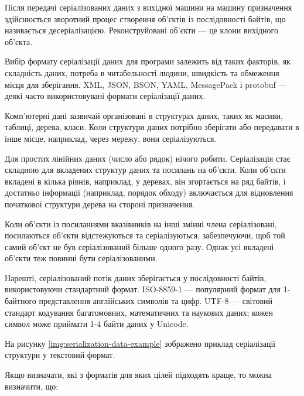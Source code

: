 \documentclass{lib/styles/default-style}
\begin{document}
    Після передачі серіалізованих даних з вихідної машини на машину призначення
    здійснюється зворотний процес створення об'єктів із послідовності байтів, що називається десеріалізацією.
    Реконструйовані об'єкти --- це клони вихідного об'єкта.

    Вибір формату серіалізації даних для програми залежить
    від таких факторів, як складність даних, потреба в читабельності людини, швидкість
    та обмеження місця для зберігання. XML, JSON, BSON, YAML, MessagePack і protobuf --- деякі
    часто використовувані формати серіалізації даних.


    Комп'ютерні дані зазвичай організовані в структурах даних, таких як масиви,
    таблиці, дерева, класи. Коли структури даних потрібно зберігати або передавати
    в інше місце, наприклад, через мережу, вони серіалізуються.

    Для простих лінійних даних (число або рядок) нічого робити.
    Серіалізація стає складною для вкладених структур даних та посилань на об'єкти.
    Коли об'єкти вкладені в кілька рівнів, наприклад, у деревах, він згортається на ряд
    байтів, і достатньо інформації (наприклад, порядок обходу) включається для відновлення
    початкової структури дерева на стороні призначення.

    Коли об'єкти із посиланнями вказівників
    на інші змінні члена серіалізовані, посилаються об'єкти відстежуються та
    серіалізуються, забезпечуючи, щоб той самий об’єкт не був серіалізований більше одного разу.
    Однак усі вкладені об'єкти теж повинні бути серіалізованими.

    Нарешті, серіалізований потік даних зберігається у послідовності байтів,
    використовуючи стандартний формат.
    ISO-8859-1 --- популярний формат для 1-байтного представлення англійських символів та цифр.
    UTF-8 --- світовий стандарт кодування багатомовних, математичних та наукових даних; кожен символ може приймати 1-4 байти даних у Unicode.

    На рисунку \ref{img:serialization-data-example} зображено приклад серіалізації структури у текстовий формат.

    
    Якщо визначати, які з форматів для яких цілей підходять краще, то можна визначити, що:
\end{document}

